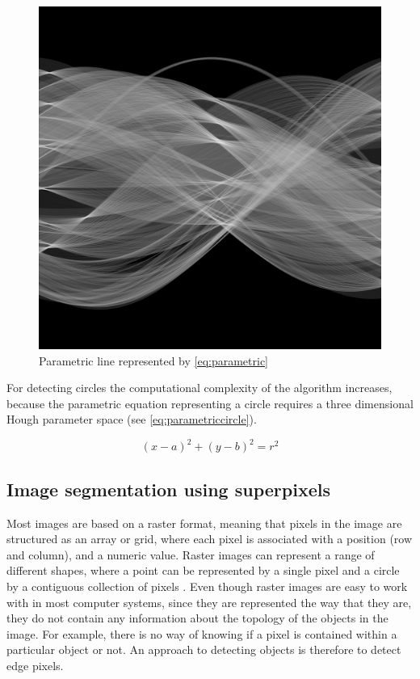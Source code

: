 \begin{figure}[!h]
	\centering
	\includegraphics[scale=0.2]{fig/hough_transform.png}
	\caption{Parametric line represented by \autoref{eq:parametric} \citep{Fisher2003}}
	\label{fig:parametricline}
\end{figure}

For detecting circles the computational complexity of the algorithm increases, because the parametric equation representing a circle requires a three dimensional Hough parameter space (see \autoref{eq:parametriccircle}).

\begin{equation}
	(x-a)^{2}+(y-b)^{2} = r^{2}
	\label{eq:parametriccircle}
\end{equation}

\subsection{Image segmentation using superpixels}
Most images are based on a raster format, meaning that pixels in the image are structured as an array or grid, where each pixel is associated with a position (row and column), and a numeric value. Raster images can represent a range of different shapes, where a point can be represented by a single pixel and a circle by a contiguous collection of pixels \citep{Worboys2003}. Even though raster images are easy to work with in most computer systems, since they are represented the way that they are, they do not contain any information about the topology of the objects in the image. For example, there is no way of knowing if a pixel is contained within a particular object or not. An approach to detecting objects is therefore to detect edge pixels.

